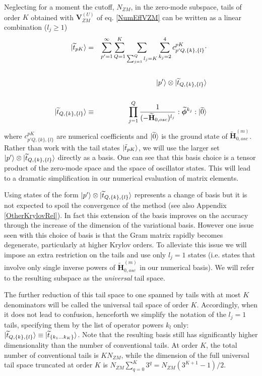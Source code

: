 \documentclass[twocolumn,secnumarabic,amssymb, nobibnotes, aps, prd]{revtex4-2}
\begin{document}
Neglecting for a moment the cutoff, $N_{ZM}$, in the zero-mode subspace, tails of order $K$ obtained with $\mathbf{V}_{ZM}^{(U)}$ of eq. \eqref{NumEffVZM} can be written as a linear combination ($l_j\geq1$)
\begin{eqnarray}
\ket{\widetilde t_{pK}} &=& \sum_{p'=1}^{\infty}\sum_{Q=1}^K\sum_{\sum_{j=1}^Q l_j=K}\sum^4_{k_j=2} c^{pK}_{p'Q,\{k\},\{l\}}\cdot\cr\cr
&&\ket{p'}\otimes\ket{\widetilde  t_{Q,\{k\},\{l\}}}\cr\cr
\ket{\widetilde  t_{Q,\{k\},\{l\}}}&\equiv& \prod_{j=1}^Q\frac{1}
{(-\widetilde{\mathbf{H}}_{0,osc})^{l_j}}:\widetilde{\boldsymbol\phi}^{k_j}:\ket{\widetilde{0}}\label{CompTailBasis}
\end{eqnarray}
where $c^{pK}_{p'Q,\{k\},\{l\}}$ are numerical coefficients and $\ket{\widetilde{0}}$ is the ground state of $\widetilde{\mathbf{H}}_{0,osc}^{(m)}$.
Rather than work with the tail states $\ket{\tilde t_{pK}}$, we will use the larger set $\ket{p'}\otimes\ket{\widetilde  t_{Q,\{k\},\{l\}}}$ directly as a basis.  One can see that this basis choice is a tensor product of the zero-mode space and the space of oscillator states.  This will lead to a dramatic simplification in our numerical evaluation of matrix elements.


Using states of the form $\ket{p'}\otimes\ket{\widetilde  t_{Q,\{k\},\{l\}}}$ represents a change of basis but it is not expected to spoil the convergence of the method (see also Appendix \ref{OtherKrylovRel}). In fact this extension of the basis improves on the accuracy through the increase of the dimension of the variational basis. However one issue seen with this choice of basis is that the Gram matrix rapidly becomes degenerate, particularly at higher Krylov orders. To alleviate this issue we will impose an extra restriction on the tails and use only $l_j=1$ states (i.e. states that involve only single inverse powers of $\widetilde{\mathbf{H}}_{0,osc}^{(m)}$ in our numerical basis). We will refer to the resulting subspace as the \textit{universal} tail space. 

The further reduction of this tail space to one spanned by tails with at most $K$ denominators will be called the universal tail space of order $K$. Accordingly, when it does not lead to confusion, henceforth we simplify the notation of the $l_j=1$ tails, specifying them by the list of operator powers $k_l$ only: $\ket{\widetilde  t_{Q,\{k\},\{l\}}}\equiv\ket{\widetilde  t_{\{k_1\dots k_K\}}}$. %
Note that the resulting basis still has significantly higher dimensionality than the number of conventional tails. At order $K$, the total number of conventional tails is $KN_{ZM}$, while the dimension of the full universal tail space truncated at order $K$ is $N_{ZM}\sum_{q=0}^K 3^q=N_{ZM}(3^{K+1}-1)/2$. %
\end{document}
